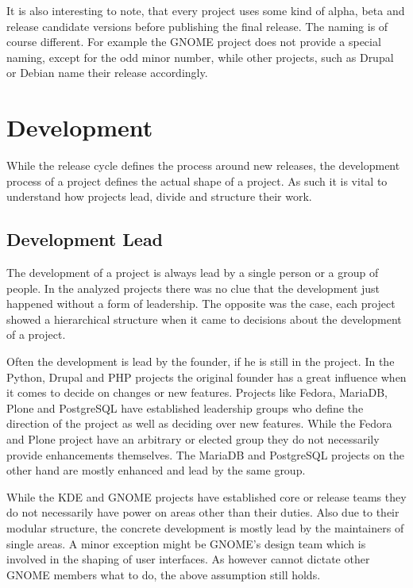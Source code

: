 It is also interesting to note, that every project uses some kind of alpha,
beta and release candidate versions before publishing the final release. The
naming is of course different. For example the GNOME project does not provide a
special naming, except for the odd minor number, while other projects, such as
Drupal or Debian name their release accordingly.



\section{Development} %

While the release cycle defines the process around new releases, the
development process of a project defines the actual shape of a project. As such
it is vital to understand how projects lead, divide and structure their work.

\subsection{Development Lead} %

The development of a project is always lead by a single person or a group of
people. In the analyzed projects there was no clue that the development just
happened without a form of leadership. The opposite was the case, each project
showed a hierarchical structure when it came to decisions about the development
of a project.

Often the development is lead by the founder, if he is still in the project.
In the Python, Drupal and PHP projects the original founder has a great
influence when it comes to decide on changes or new features. Projects like
Fedora, MariaDB, Plone and PostgreSQL have established leadership groups who
define the direction of the project as well as deciding over new features.
While the Fedora and Plone project have an arbitrary or elected group they do
not necessarily provide enhancements themselves. The MariaDB and PostgreSQL
projects on the other hand are mostly enhanced and lead by the same group.

While the KDE and GNOME projects have established core or release teams they do
not necessarily have power on areas other than their duties. Also due to their
modular structure, the concrete development is mostly lead by the maintainers
of single areas. A minor exception might be GNOME's design team which is
involved in the shaping of user interfaces. As however cannot dictate other
GNOME members what to do, the above assumption still holds.

